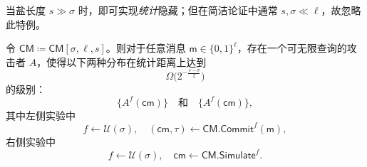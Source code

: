 \documentclass[american,singlepageview]{snargs-book-zh}
\newcommand{\Bits}{\{0,1\}}
\newcommand{\DefineEqual}{\coloneqq}
\newcommand{\ProtoAdversary}{A}
\newcommand{\ProtoSalt}{\tau}
\newcommand{\ROFunction}{f}
\newcommand{\RODistribution}[1]{\mathcal{U}(#1)}
\newcommand{\ROOutputSize}{\sigma}
\newcommand{\CMSymbol}{\mathsf{CM}}
\newcommand{\CMConstructor}[3]{\CMSymbol[#1,#2,#3]}
\newcommand{\CMCommit}{\CMSymbol.\mathsf{Commit}}
\newcommand{\CMSimulator}{\CMSymbol.\mathsf{Simulate}}
\newcommand{\CMMessageLength}{\ell}
\newcommand{\CMSaltSize}{s}
\newcommand{\CMCommitment}{\mathsf{cm}}
\newcommand{\CMMessage}{\mathsf{m}}
\newcommand{\CMSaltString}{\ProtoSalt}
\newcommand{\CMAdversary}{\ProtoAdversary}
\begin{document}
\begin{remark}
当盐长度 $\CMSaltSize\gg\ROOutputSize$ 时，即可实现\emph{统计}隐藏；但在简洁论证中通常 $\CMSaltSize,\ROOutputSize\ll\CMMessageLength$，故忽略此特例。
\end{remark}

\begin{claim}
\label{claim:cm-tightness-of-unbounded-case}
令 $\CMSymbol\DefineEqual\CMConstructor{\ROOutputSize}{\CMMessageLength}{\CMSaltSize}$。则对于任意消息 $\CMMessage\in\Bits^{\CMMessageLength}$，存在一个可无限查询的攻击者 $\CMAdversary$，使得以下两种分布在统计距离上达到
\[
\Omega\!\bigl(2^{-\tfrac{\CMSaltSize-\ROOutputSize}{2}}\bigr)
\]
的级别：
\[
\bigl\{\CMAdversary^{\ROFunction}(\CMCommitment)\bigr\}
\quad\text{和}\quad
\bigl\{\CMAdversary^{\ROFunction}(\CMCommitment)\bigr\},
\]
其中左侧实验中
\[
\ROFunction\gets\RODistribution{\ROOutputSize},\quad
(\CMCommitment,\CMSaltString)\gets\CMCommit^{\ROFunction}(\CMMessage),
\]
右侧实验中
\[
\ROFunction\gets\RODistribution{\ROOutputSize},\quad
\CMCommitment\gets\CMSimulator^{\ROFunction}.
\]
\end{claim}
\end{document}
